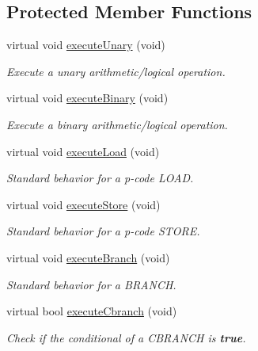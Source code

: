 \subsection*{Protected Member Functions}
\begin{DoxyCompactItemize}
\item 
virtual void \mbox{\hyperlink{class_emulate_memory_af31f9f35bb843b59d6a509bcbb045894}{execute\+Unary}} (void)
\begin{DoxyCompactList}\small\item\em Execute a unary arithmetic/logical operation. \end{DoxyCompactList}\item 
virtual void \mbox{\hyperlink{class_emulate_memory_a1570bf6221f1d26978873823f94ce469}{execute\+Binary}} (void)
\begin{DoxyCompactList}\small\item\em Execute a binary arithmetic/logical operation. \end{DoxyCompactList}\item 
virtual void \mbox{\hyperlink{class_emulate_memory_ad612d22e967669919fd5c8538ade212f}{execute\+Load}} (void)
\begin{DoxyCompactList}\small\item\em Standard behavior for a p-\/code L\+O\+AD. \end{DoxyCompactList}\item 
virtual void \mbox{\hyperlink{class_emulate_memory_a3fed95d66c73d4dad23532f959a9417d}{execute\+Store}} (void)
\begin{DoxyCompactList}\small\item\em Standard behavior for a p-\/code S\+T\+O\+RE. \end{DoxyCompactList}\item 
virtual void \mbox{\hyperlink{class_emulate_memory_ac69d1f93ffc1a86d3486af34bb520302}{execute\+Branch}} (void)
\begin{DoxyCompactList}\small\item\em Standard behavior for a B\+R\+A\+N\+CH. \end{DoxyCompactList}\item 
virtual bool \mbox{\hyperlink{class_emulate_memory_a098137ac05d9118162a1d0aaa5506d0b}{execute\+Cbranch}} (void)
\begin{DoxyCompactList}\small\item\em Check if the conditional of a C\+B\+R\+A\+N\+CH is {\bfseries{true}}. \end{DoxyCompactList}\item 

\end{DoxyCompactItemize}
